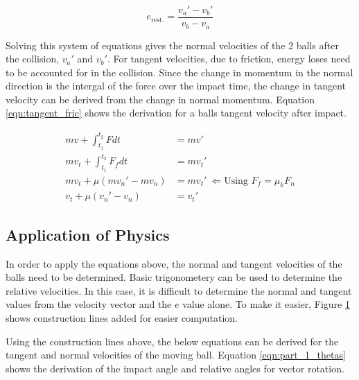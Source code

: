 \documentclass[12pt]{article}
\begin{document}
\begin{equation}
    \label{eqn:pt1_restitution}
    e_{\text{rest.}} = \frac{v_a' - v_b'}{v_b - v_a}
\end{equation}

Solving this system of equations gives the normal velocities of the 2 balls after the collision, $v_a'$ and $v_b'$. For tangent
velocities, due to friction, energy loses need to be accounted for in the collision. Since the change in momentum
in the normal direction is the intergal of the force over the impact time, the change in tangent velocity can be
derived from the change in normal momentum. Equation \ref{eqn:tangent_fric} shows the derivation for a balls tangent
velocity after impact.

\begin{equation}
    \label{eqn:tangent_fric}
    \begin{aligned}
        mv + \int_{t_1}^{t_2} Fdt &= mv' \\
        mv_t + \int_{t_1}^{t_2} F_f dt &= mv_t' \\
        mv_t + \mu\left(mv_n' - mv_n\right) &= mv_t' \ \Leftarrow \text{Using $F_f = \mu_k F_n$}\\
        v_t + \mu\left(v_n' - v_n\right) &= v_t'
    \end{aligned}
\end{equation}

\subsection{Application of Physics}
In order to apply the equations above, the normal and tangent velocities of the balls need to be determined. Basic
trigonometery can be used to determine the relative velocities. In this case, it is difficult to determine the 
normal and tangent values from the velocity vector and the $e$ value alone. To make it easier, Figure 
\ref{P1_diag_exp} shows construction lines added for easier computation.

\begin{figure}[H]
    \centering
    
    \label{P1_diag_exp}
\end{figure}

Using the construction lines above, the below equations can be derived for the tangent and normal velocities of the
moving ball. Equation \ref{eqn:part_1_thetas} shows the derivation of the impact angle and relative angles for vector rotation.
\end{document}

